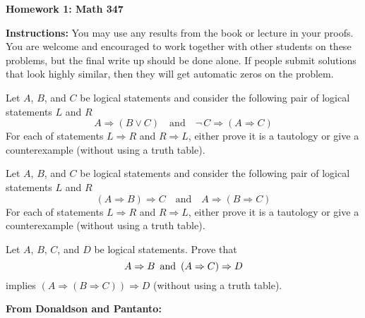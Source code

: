 \documentclass[11pt]{article}
\begin{document}
\flushright


\begin{center}
    \textbf{\large Homework 1: Math 347}
\end{center}

\begin{center}
	\textbf{Instructions:} 
		You may use any results from the book or lecture in your proofs.  You are welcome and encouraged to work together with other students on these problems, but the final write up should be done alone.  If people submit solutions that look highly similar, then they will get automatic zeros on the problem.
	\end{center}

    
\begin{list}{\textbf{Problem .}}{ \setlength{\leftmargin}{0in}}


\item Let $A$, $B$, and $C$ be logical statements and consider the following pair of logical statements $L$ and $R$
$$
	A \Rightarrow (B \vee C) \quad \mbox{and}\quad \neg\, C \Rightarrow (A \Rightarrow C)
$$
For each of statements $L \Rightarrow R$ and $R \Rightarrow L$, either prove it is a tautology or give a counterexample (without using a truth table).


\item Let $A$, $B$, and $C$ be logical statements and consider the following pair of logical statements $L$ and $R$
$$
	(A \Rightarrow B) \Rightarrow C \quad \mbox{and}\quad A \Rightarrow (B \Rightarrow C)
$$
For each of statements $L \Rightarrow R$ and $R \Rightarrow L$, either prove it is a tautology or give a counterexample (without using a truth table).



\item Let $A$, $B$, $C$, and $D$ be logical statements.  Prove that
$$
\mbox{$A \Rightarrow B$\, and\, $(A \Rightarrow C) \Rightarrow D$}
$$
implies $(A \Rightarrow (B \Rightarrow C)) \Rightarrow D$
(without using a truth table).

\vspace{.2in}

\noindent

\textbf{From Donaldson and Pantanto:}


\end{list}
\end{document}
